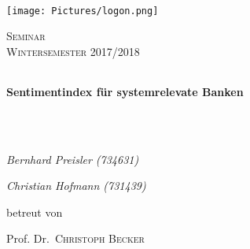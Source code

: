 

\setlength{\parindent}{0pt}

\renewcommand{\footrulewidth}{0.8pt}

\begin{titlepage}
	\text{}\vspace{-0.15cm}\\
	\begin{center}\hspace{-1.15cm} 
		\texttt{[image: Pictures/logon.png]} 
	\end{center}
	
	\vspace{1.0cm}
	
	\vspace{0.25cm}
	
	\begin{center}\Large{\textsc{Seminar \\Wintersemester 2017/2018}}
	\end{center}\vspace{1.5cm}
	
	\begin{tabularx}
		{\textwidth}{l}
		\hline
	\end{tabularx}
	
	\begin{center}
		\LARGE{\textbf{Sentimentindex für systemrelevate Banken}}
	\end{center}
	
	\begin{tabularx}
		{\textwidth}{l}
		\hline
	\end{tabularx}\vspace{1.4cm}\\
	
	
	\begin{center}
		{\Large\itshape Bernhard Preisler (734631)\par}
		{\Large\itshape Christian Hofmann (731439)\par}
	\end{center}
	\vfill
	betreut von\par
	Prof. Dr.~\textsc{Christoph Becker}
	

\end{titlepage}
